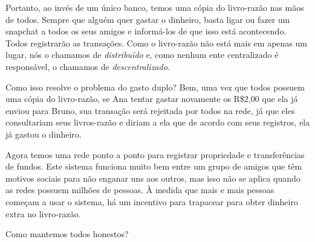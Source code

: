 Portanto, ao invés de um único banco, temos uma cópia do livro-razão nas mãos de todos. Sempre que alguém quer gastar o dinheiro, basta ligar ou fazer um snapchat a todos os seus amigos e informá-los de que isso está acontecendo. Todos registrarão as transações. Como o livro-razão não está mais em apenas um lugar, nós o chamamos de \textit{distribuído} e, como nenhum ente centralizado é responsável, o chamamos de \textit{descentralizado}.

Como isso resolve o problema do gasto duplo? Bem, uma vez que todos possuem uma cópia do livro-razão, se Ana tentar gastar novamente os R\$2,00 que ela já enviou para Bruno, sua transação será rejeitada por todos na rede, já que eles consultariam seus livros-razão e diriam a ela que de acordo com seus registros, ela já gastou o dinheiro.

Agora temos uma rede ponto a ponto para registrar propriedade e transferências de fundos. Este sistema funciona muito bem entre um grupo de amigos que têm motivos sociais para não enganar uns aos outros, mas isso não se aplica quando as redes possuem milhões de pessoas. À medida que mais e mais pessoas começam a usar o sistema, há um incentivo para trapacear para obter dinheiro extra no livro-razão.

Como mantemos todos honestos?